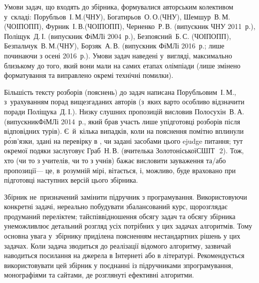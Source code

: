 {

Умови задач, що входять до збірника, формувалися авторським колективом у~складі: Порубльов~І.$\,$М.\nolinebreak[3] (ЧНУ), Богатирьов~О.$\,$О.\nolinebreak[3] (ЧНУ), Шемшур~В.$\,$М.\nolinebreak[3] (ЧОІПОПП), Фурник~І.$\,$В.\nolinebreak[3] (ЧОІПОПП), Черненко~Р.$\,$В. (випускник ЧНУ 2011~р.), Поліщук~Д.$\,$І. (випускник \mbox{ФіМЛі} 2004~р.), Безпоясний~Б.$\,$С. (ЧОІПОПП), Безпальчук~В.$\,$М.\nolinebreak[3] (ЧНУ), Борзяк~А.$\,$В. (випускник \mbox{ФіМЛі} 2016~р.; лише починаючи з осені 2016~р.). Умови задач наведені у~вигляді, максимально близькому до того, який вони мали на самих етапах олімпіади (лише змінено форматування та виправлено окремі технічні помилки). 

Більшість тексту розборів (пояснень) до задач написана Порубльовим~І.$\,$М., з~урахуванням порад вищезгаданих авторів (з~яких варто особливо відзначити поради Поліщука~Д.$\,$І.). 
Низку слушних пропозицій висловив Полосухін~В.$\,$А. (випускник\nolinebreak[2] \mbox{ФіМЛі} 2014~р., який брав участь лише у\nolinebreak[3] підготовці розборів після відповідних турів). 
Є~й~кілька випадків, коли на пояснення помітно вплинули р\'{о}зв'язки, здані на перевірку в \EjudgeCkipoName{}, чи задані засобами цього ejudge питання; тут окремої подяки заслуговує Граб~Н.$\,$В. (вчителька Золотоніської\nolinebreak[3] СШІТ~\textnumero$\,$2).
Тож, хто (чи то з учителів, чи то з учнів) бажає висловити зауваження та/або пропозиції\nolinebreak[3] --- це, в~розумній мірі, вітається, і, можливо, буде враховано при підготовці наступних версій цього збірника.

}


Збірник не~призначений замінити підручник з програмування. Використовуючи конкретні задачі, нереально побудувати збалансований курс, що\nolinebreak[2] розглядає продуманий перелік\nolinebreak[2] тем; та\nolinebreak[3] й\nolinebreak[1] співвідношення обсягу задач %
та обсягу збірника %
унеможливлює детальний розгляд усіх потрібних у цих задачах алгоритмів. Тому основна увага у~збірнику приділена поясненням нестандартних рішень у цих задачах. 
Коли задача зводиться до реалізації відомого алгоритму, зазвичай наводиться посилання на джерела в Інтернеті або в літературі. 
Рекомендується використовувати цей збірник у поєднанні із підручниками з\nolinebreak[3] програмування, монографіями та сайтами, де розглянуті ефективні алгоритми.


